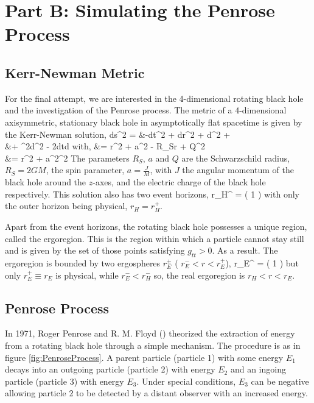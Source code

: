 \section{Part B: Simulating the Penrose Process}
\label{Sec3}

\subsection{Kerr-Newman Metric}
For the final attempt, we are interested in the 4-dimensional rotating black hole and the investigation of the Penrose process. The metric of a 4-dimensional axisymmetric, stationary black hole in asymptotically flat spacetime is given by the Kerr-Newman solution,
\be\ba\label{Metric_Kerr-Newman}
	ds^2 = &-dt^2 + \frac{\Sigma}{\Delta}dr^2 + \Sigma d\theta^2 + \\
	&+ \sin^2\theta d\phi^2 - 2dtd\phi
\ea\ee
with,
\be\ba
	\Delta &= r^2 + a^2 - R_{S}r + Q^2 \\
	\Sigma &= r^2 + a^2\cos^2\theta
\ea\ee
The parameters $R_{S}$, $a$ and $Q$ are the Schwarzschild radius, $R_{S}=2GM$, the spin parameter, $a=\frac{J}{M}$, with $J$ the angular momentum of the black hole around the $z$-axes, and the electric charge of the black hole respectively. This solution also has two event horizons,
\be
	r_{H}^{\pm} = \left( 1 \pm {} \right)
\ee
with only the outer horizon being physical, $r_{H} = r_{H}^{+}$.

Apart from the event horizons, the rotating black hole possesses a unique region, called the ergoregion. This is the region within which a particle cannot stay still and is given by the set of those points satisfying $g_{tt}>0$. As a result. The ergoregion is bounded by two ergospheres $r_{E}^{\pm}$ ( $r_{E}^{-} < r < r_{E}^{+}$),
\be
	r_{E}^{\pm} = \left( 1 \pm {}  \right)
\ee
but only $r_{E}^{+} \equiv r_{E}$ is physical, while $r_{E}^{-} < r_{H}^{-}$ so, the real ergoregion is $r_{H}<r<r_{E}$.

\subsection{Penrose Process}
In 1971, Roger Penrose and R. M. Floyd (\cite{Penrose1971}) theorized the extraction of energy from a rotating black hole through a simple mechanism. The procedure is as in figure \ref{fig:PenroseProcess}. A parent particle (particle 1) with some energy $E_1$ decays into an outgoing particle (particle 2) with energy $E_2$ and an ingoing particle (particle 3) with energy $E_3$. Under special conditions, $E_3$ can be negative allowing particle 2 to be detected by a distant observer with an increased energy.


